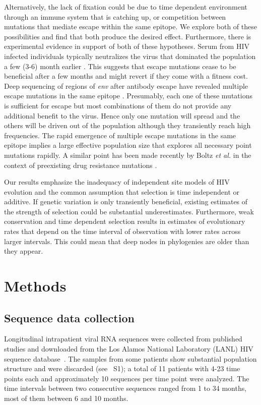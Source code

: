 \documentclass[rmp, twocolumn]{revtex4}
\newcommand{\env}{\textit{env}}
\newcommand{\PCApat}{1}
\begin{document}
Alternatively, the lack of fixation could be due to time dependent environment
through an immune system that is catching up, or competition between mutations
that mediate escape within the same epitope. We explore both of these
possibilities and find that both produce the desired effect. Furthermore, there
is experimental evidence in support of both of these hypotheses. Serum from HIV
infected individuals typically neutralizes the virus that dominated the
population a few (3-6) month earlier \citep{richman_rapid_2003}. This suggests that
escape mutations cease to be beneficial after a few months and might revert if
they come with a fitness cost. Deep sequencing of regions of \env{} after
antibody escape have revealed multiple escape mutations in the same epitope
\citep{moore_limited_2009, bar_early_2012}. Presumably, each one of these
mutations is sufficient for escape but most combinations of them do not provide
any additional benefit to the virus. Hence only one mutation will spread and the
others will be driven out of the population although they transiently reach high
frequencies. The rapid emergence of multiple escape mutations in the same
epitope implies a large effective population size that explores all necessary point
mutations rapidly. A similar point has been made recently by Boltz {\it et al.}
in the context of preexisting drug resistance mutations
\citep{boltz_ultrasensitive_2012}. 

Our results emphasize the inadequacy of independent site models of HIV evolution
and the common assumption that selection is time independent or additive. 
If genetic variation is only transiently beneficial, existing estimates of the
strength of selection \citep{neher_recombination_2010,batorsky_estimate_2011}
could be substantial underestimates. Furthermore, weak conservation and
time dependent selection results in estimates of evolutionary 
rates that depend on the time interval of observation with lower rates across
larger intervals. This could mean that deep nodes in phylogenies are older than 
they appear.

\section{Methods}
\subsection{Sequence data collection}
Longitudinal intrapatient viral RNA sequences were collected from published
studies \citep{shankarappa_consistent_1999, liu_selection_2006,
bunnik_autologous_2008} and downloaded from the Los Alamos National Laboratory
(LANL) HIV sequence database~\citep{LANL2012}. The samples from some patients
show substantial population structure and were discarded (see
\figurename~S\PCApat); a total of 11 patients with 4-23 time points each and
approximately 10 sequences per time point were analyzed. The time intervals
between two consecutive sequences ranged from 1 to 34 months, most of them
between 6 and 10 months.
\end{document}
